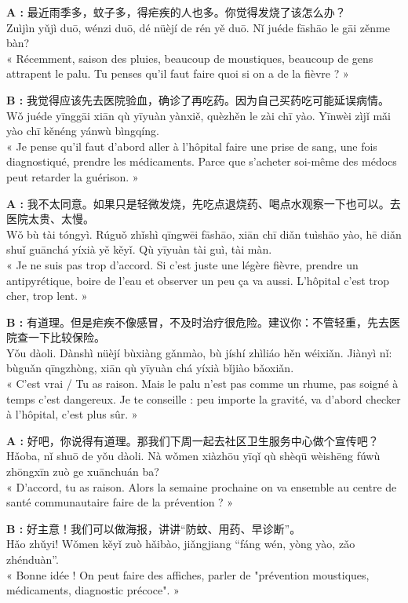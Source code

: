 \documentclass[11pt]{article}
\begin{document}
\begin{textebox}
\textbf{A :} 最近雨季多，蚊子多，得疟疾的人也多。你觉得发烧了该怎么办？\\
Zuìjìn yǔjì duō, wénzi duō, dé nüèjí de rén yě duō. Nǐ juéde fāshāo le gāi zěnme bàn?\\
« Récemment, saison des pluies, beaucoup de moustiques, beaucoup de gens attrapent le palu. Tu penses qu'il faut faire quoi si on a de la fièvre ? »

\textbf{B :} 我觉得应该先去医院验血，确诊了再吃药。因为自己买药吃可能延误病情。\\
Wǒ juéde yīnggāi xiān qù yīyuàn yànxiě, quèzhěn le zài chī yào. Yīnwèi zìjǐ mǎi yào chī kěnéng yánwù bìngqíng.\\
« Je pense qu'il faut d'abord aller à l'hôpital faire une prise de sang, une fois diagnostiqué, prendre les médicaments. Parce que s'acheter soi-même des médocs peut retarder la guérison. »

\textbf{A :} 我不太同意。如果只是轻微发烧，先吃点退烧药、喝点水观察一下也可以。去医院太贵、太慢。\\
Wǒ bù tài tóngyì. Rúguǒ zhǐshì qīngwēi fāshāo, xiān chī diǎn tuìshāo yào, hē diǎn shuǐ guānchá yíxià yě kěyǐ. Qù yīyuàn tài guì, tài màn.\\
« Je ne suis pas trop d'accord. Si c'est juste une légère fièvre, prendre un antipyrétique, boire de l'eau et observer un peu ça va aussi. L'hôpital c'est trop cher, trop lent. »

\textbf{B :} 有道理。但是疟疾不像感冒，不及时治疗很危险。建议你：不管轻重，先去医院查一下比较保险。\\
Yǒu dàoli. Dànshì nüèjí bùxiàng gǎnmào, bù jíshí zhìliáo hěn wéixiǎn. Jiànyì nǐ: bùguǎn qīngzhòng, xiān qù yīyuàn chá yíxià bǐjiào bǎoxiǎn.\\
« C'est vrai / Tu as raison. Mais le palu n'est pas comme un rhume, pas soigné à temps c'est dangereux. Je te conseille : peu importe la gravité, va d'abord checker à l'hôpital, c'est plus sûr. »

\textbf{A :} 好吧，你说得有道理。那我们下周一起去社区卫生服务中心做个宣传吧？\\
Hǎoba, nǐ shuō de yǒu dàoli. Nà wǒmen xiàzhōu yīqǐ qù shèqū wèishēng fúwù zhōngxīn zuò ge xuānchuán ba?\\
« D'accord, tu as raison. Alors la semaine prochaine on va ensemble au centre de santé communautaire faire de la prévention ? »

\textbf{B :} 好主意！我们可以做海报，讲讲“防蚊、用药、早诊断”。\\
Hǎo zhǔyi! Wǒmen kěyǐ zuò hǎibào, jiǎngjiang “fáng wén, yòng yào, zǎo zhénduàn”.\\
« Bonne idée ! On peut faire des affiches, parler de "prévention moustiques, médicaments, diagnostic précoce". »
\end{textebox}
\end{document}
